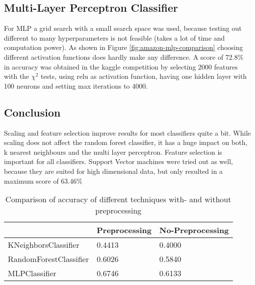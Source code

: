 \subsection{Multi-Layer Perceptron Classifier}

For MLP a grid search with a small search space was used, because testing out different to many hyperparameters is not feasible (takes a lot of time and computation power).
As shown in Figure \ref{fig:amazon-mlp-comparison} choosing different activation functions does hardly make any difference.
A score of 72.8\% in accuracy was obtained in the kaggle competition by  selecting 2000 features with the ${\chi}^2$ tests, using relu as activation function, having one hidden layer with 100 neurons and setting max iterations to 4000.



\subsection{Conclusion}

Scaling and feature selection improve results for most classifiers quite a bit. While scaling does not affect the random forest classifier, it has a huge impact on both, k nearest neighbours and the multi layer perceptron. Feature selection is important for all classifiers. Support Vector machines were tried out as well, because they are suited for high dimensional data, but only resulted in a maximum score of 63.46\%

\begin{table}[ht]
\begin{center}
\begin{tabular}{|l|l|l|}
\hline
                       & Preprocessing & No-Preprocessing \\ \hline
KNeighborsClassifier   & 0.4413        & 0.4000           \\ \hline
RandomForestClassifier & 0.6026        & 0.5840           \\ \hline
MLPClassifier          & 0.6746        & 0.6133           \\ \hline
\end{tabular}
\caption{Comparison of accuracy of different techniques with- and without preprocessing}
\end{center}
\end{table}

